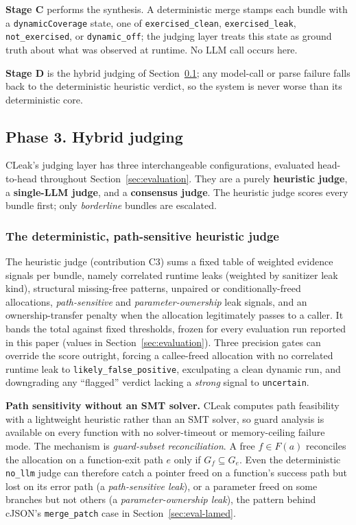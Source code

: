 \documentclass[a4paper]{llncs}
\begin{document}
\textbf{Stage C} performs the synthesis. A deterministic merge stamps each bundle
with a \texttt{dynamicCoverage} state, one of
\texttt{exercised\_clean}, \texttt{exercised\_leak}, \texttt{not\_exercised},
or \texttt{dynamic\_off}; the judging layer treats this state as ground truth
about what was observed at runtime. No LLM call occurs here.

\textbf{Stage D} is the hybrid judging of
Section~\ref{sec:judging}; any model-call or parse failure falls back
to the deterministic heuristic verdict, so the system is never worse
than its deterministic core.

\subsection{Phase 3. Hybrid judging}
\label{sec:judging}

CLeak's judging layer has three interchangeable configurations,
evaluated head-to-head throughout Section~\ref{sec:evaluation}. They are a
purely \textbf{heuristic judge}, a \textbf{single-LLM judge}, and a
\textbf{consensus judge}. The heuristic judge scores every bundle
first; only \emph{borderline} bundles are escalated.

\subsubsection{The deterministic, path-sensitive heuristic judge}

The heuristic judge (contribution C3) sums a fixed table of weighted
evidence signals per bundle, namely correlated runtime leaks (weighted by
sanitizer leak kind), structural missing-free patterns,
unpaired or conditionally-freed allocations, \emph{path-sensitive} and
\emph{parameter-ownership} leak signals, and an
ownership-transfer penalty when the allocation legitimately passes to a
caller. It bands the total against fixed thresholds, frozen for every
evaluation run reported in this paper (values in
Section~\ref{sec:evaluation}). Three precision gates can override the
score outright, forcing a callee-freed allocation with no correlated
runtime leak to \texttt{likely\_false\_positive}, exculpating a clean
dynamic run, and downgrading any ``flagged'' verdict lacking a
\emph{strong} signal to \texttt{uncertain}.

\textbf{Path sensitivity without an SMT solver.} CLeak computes path
feasibility with a lightweight heuristic rather than an SMT solver, so
guard analysis is available on every function with no solver-timeout or
memory-ceiling failure mode. The mechanism is \emph{guard-subset
reconciliation}. A free $f \in F(a)$ reconciles the
allocation on a function-exit path $e$ only if $G_f \subseteq G_e$.
Even the
deterministic \texttt{no\_llm} judge can therefore catch a
pointer freed on a function's success path but lost on its error path
(a \emph{path-sensitive leak}), or a parameter freed on some branches
but not others (a \emph{parameter-ownership leak}), the pattern
behind cJSON's \texttt{merge\_patch} case in
Section~\ref{sec:eval-lamed}.
\end{document}
